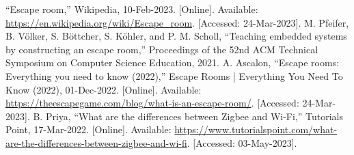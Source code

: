 \documentclass[conference]{IEEEtran}
\begin{document}
\indent 

\begin{thebibliography}{00}

     “Escape room,” Wikipedia, 10-Feb-2023. [Online]. Available: \url{https://en.wikipedia.org/wiki/Escape_room}. [Accessed: 24-Mar-2023].
     M. Pfeifer, B. Völker, S. Böttcher, S. Köhler, and P. M. Scholl, “Teaching embedded systems by constructing an escape room,” Proceedings of the 52nd ACM Technical Symposium on Computer Science Education, 2021.    
     A. Ascalon, “Escape rooms: Everything you need to know (2022),” Escape Rooms | Everything You Need To Know (2022), 01-Dec-2022. [Online]. Available:  \url{https://theescapegame.com/blog/what-is-an-escape-room/}. [Accessed: 24-Mar-2023].
     B. Priya, “What are the differences between Zigbee and Wi-Fi,” Tutorials Point, 17-Mar-2022. [Online]. Available: \url{https://www.tutorialspoint.com/what-are-the-differences-between-zigbee-and-wi-fi}. [Accessed: 03-May-2023].

\end{thebibliography}
\end{document}
